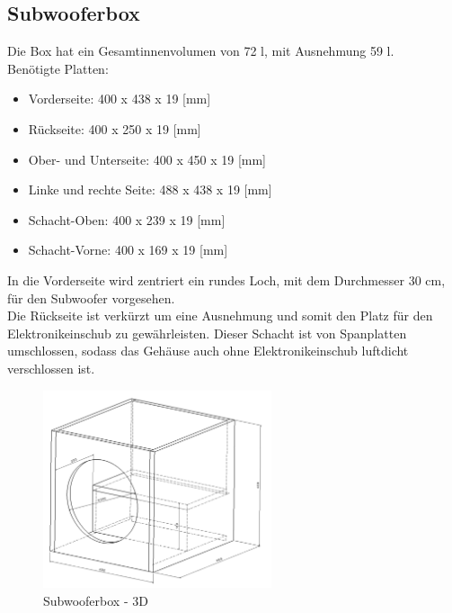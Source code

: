\subsection{Subwooferbox}
Die Box hat ein Gesamtinnenvolumen von 72 l, mit Ausnehmung 59 l.\\
Benötigte Platten:
\begin{itemize}
	\item Vorderseite: 400 x 438 x 19 [mm]
	\item Rückseite: 400 x 250 x 19 [mm]
	\item Ober- und Unterseite: 400 x 450 x 19 [mm]
	\item Linke und rechte Seite: 488 x 438 x 19 [mm]
	\item Schacht-Oben: 400 x 239 x 19 [mm]
	\item Schacht-Vorne: 400 x 169 x 19 [mm]
\end{itemize}
In die Vorderseite wird zentriert ein rundes Loch, mit dem Durchmesser 30 cm, für den Subwoofer vorgesehen.\\
Die Rückseite ist verkürzt um eine Ausnehmung und somit den Platz für den Elektronikeinschub zu gewährleisten.
Dieser Schacht ist von Spanplatten umschlossen, sodass das Gehäuse auch ohne Elektronikeinschub luftdicht verschlossen ist.
\begin{figure} [H]
	\centering
	\includegraphics[width=0.6\textwidth]{img/Fertigungsunterlagen/Subwooferbox.png}
	\caption{Subwooferbox - 3D}
	\label {fig:8.11.1}
\end{figure}


